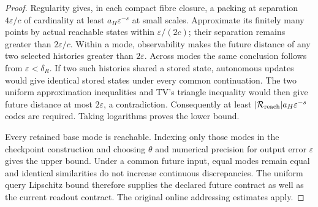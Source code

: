 \begin{proof}
Regularity gives, in each compact fibre closure, a packing at separation
$4\varepsilon/c$ of cardinality at least $a_H\varepsilon^{-s}$ at small
scales. Approximate its finitely many points by actual reachable states
within $\varepsilon/(2c)$; their separation remains greater than
$2\varepsilon/c$. Within a mode, observability makes the future distance
of any two selected histories greater than $2\varepsilon$. Across modes
the same conclusion follows from $\varepsilon<\delta_R$.
If two such histories shared a stored state, autonomous updates would
give identical stored states under every common continuation. The two
uniform approximation inequalities and TV's triangle inequality would
then give future distance at most $2\varepsilon$, a contradiction.
Consequently at least $|\mathcal R_{\rm reach}|a_H\varepsilon^{-s}$
codes are required. Taking logarithms proves the lower bound.

Every retained base mode is reachable. Indexing only those modes in the
checkpoint construction and choosing $\theta$ and numerical precision
for output error $\varepsilon$ gives the upper bound. Under a common
future input, equal modes remain equal and identical similarities do not
increase continuous discrepancies. The uniform query Lipschitz bound
therefore supplies the declared future contract as well as the current
readout contract. The original online addressing estimates apply.
\end{proof}
